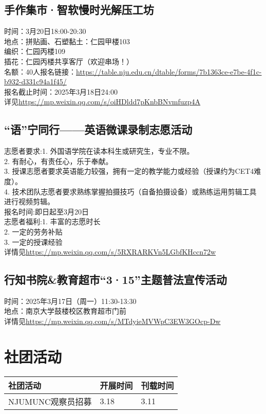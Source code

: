 \documentclass[letterpaper, 12pt]{article}
\begin{document}
\begin{multicols}{2}
\subsection{手作集市·智软慢时光解压工坊}
时间：3月20日18:00-20:30\\
地点：拼贴画、石塑黏土：仁园甲楼103\\
编织：仁园丙楼109\\
插花：仁园丙楼共享客厅（欢迎串场！）\\
名额：40人报名链接：\url{https://table.nju.edu.cn/dtable/forms/7b1363ce-e7be-4f1c-b932-d331c94a1f45/}\\
报名截止时间：2025年3月18日24:00\\
详见\url{https://mp.weixin.qq.com/s/oiHDldd7pKnbBNvmfuzp4A}\\

\subsection{“语”宁同行——英语微课录制志愿活动}
志愿者要求:1. 外国语学院在读本科生或研究生，专业不限。\\
2. 有耐心，有责任心，乐于奉献。\\
3. 授课志愿者要求英语能力较强，拥有一定的教学能力或经验（授课约为CET4难度）。\\
4. 技术团队志愿者要求熟练掌握拍摄技巧（自备拍摄设备）或熟练运用剪辑工具进行视频剪辑。\\
报名时间:即日起至3月20日\\
志愿者福利:1. 丰富的志愿时长\\
2. 一定的劳务补贴\\
3. 一定的授课经验\\
详情见\url{https://mp.weixin.qq.com/s/5RXRARKVn5LGbfKHccn72w}\\

\subsection{行知书院\&教育超市“3·15”主题普法宣传活动}
时间：2025年3月17日（周一）11:30-13:30 \\
地点：南京大学鼓楼校区教育超市门前\\
详情见\url{https://mp.weixin.qq.com/s/MTdyieMVWpC3EW3GOcp-Dw}\\
\section{社团活动}
\begin{tabular}{|>{\centering\arraybackslash}m{}|m{}|m{}|}
    \hline
    社团活动 & 开展时间 & 刊载时间\\
    \hline\hline
    NJUMUNC观察员招募 & 3.18 & 3.11\\
    \hline
\end{tabular}

\end{multicols}
\end{document}
